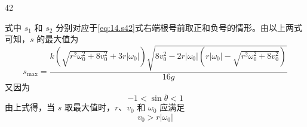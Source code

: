 \begin{solution}{42}
\begin{subsolution}
\begin{equation}
            \label{eq:16.s42}
        \end{equation}
        式中 $s_{1}$ 和 $s_{2}$ 分别对应于\eqref{eq:14.s42}式右端根号前取正和负号的情形。由以上两式可知，$s$ 的最大值为
        \begin{equation}
            s_{\max} = \frac{k\left(\sqrt{r^{2} \omega_{0}^{2} + 8v_{0}^{2}} + 3r|\omega_{0}|\right)\sqrt{8v_{0}^{2} - 2r|\omega_{0}|(r|\omega_{0}| - \sqrt{r^{2} \omega_{0}^{2} + 8v_{0}^{2}})}}{16g}
            \label{eq:17.s42}
        \end{equation}
        又因为
        \begin{equation}
            -1 < \sin\bar{\theta} < 1
            \label{eq:18.s42}
        \end{equation}
        由上式得，当 $s$ 取最大值时，$r$、$v_{0}$ 和 $\omega_{0}$ 应满足
        \begin{equation}
            v_{0} > r|\omega_{0}|
            \label{eq:19.s42}
        \end{equation}
    \end{subsolution}
\end{solution}